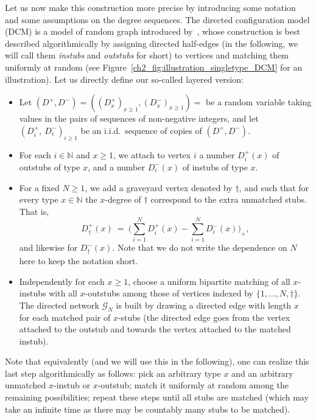 \begin{refsegment}
Let us now make this construction more precise by introducing some
notation and some assumptions on the degree sequences. The directed
configuration model (DCM) is a model of random graph introduced
by~\cite{bollobas_probabilistic_1980}, whose construction is best
described algorithmically by assigning directed half-edges (in the
following, we will call them \emph{instubs} and \emph{outstubs} for
short) to vertices and matching them uniformly at random (see
Figure~\ref{ch2_fig:illustration_singletype_DCM} for an illustration). Let
us directly define our so-called layered version:
\begin{itemize}
\item Let $(D^{+},D^-)=((D^{+}_x)_{x\geq 1},(D^-_x)_{x\geq 1})=$ be
  a random variable taking values in the pairs of sequences of
  non-negative integers, and let $(D^+_i,\ D^-_i)_{i\geq 1}$ be an
  i.i.d.\ sequence of copies of $(D^{+},D^-)$.
\item For each $i\in \mathbb{N}$ and $x\geq 1$, we attach to vertex
  $i$ a number $D^+_i(x)$ of outstubs of type $x$, and a number
  $D^-_i(x)$ of instubs of type $x$.
\item For a fixed $N\geq 1$, we add a graveyard vertex denoted by
  $\dagger$, and such that for every type $x\in\mathbb{N}$ the
  $x$-degree of $\dagger$ correspond to the extra unmatched stubs.
  That is,
  \[
    D_{\dagger}^{+}(x)\ =\ \Big(\sum_{i=1}^N D^{+}_{i}(x) -
    \sum_{i=1}^N D^{-}_{i}(x)\Big)_+,
  \]
  and likewise for $D_{\dagger}^{-}(x)$. Note that we do not write the
  dependence on $N$ here to keep the notation short.
\item Independently for each $x\geq 1$, choose a uniform bipartite
  matching of all $x$-instubs with all $x$-outstubs among those of
  vertices indexed by $\{1,\dots,N, \dagger\}$. The directed
  network $\mathcal{G}_N$ is built by drawing a directed edge with
  length $x$ for each matched pair of $x$-stubs (the directed edge
  goes from the vertex attached to the outstub and towards the vertex
  attached to the matched instub).
\end{itemize}
Note that equivalently (and we will use this in the following), one
can realize this last step algorithmically as follows: pick an
arbitrary type $x$ and an arbitrary unmatched $x$-instub or
$x$-outstub; match it uniformly at random among the remaining
possibilities; repeat these steps until all stubs are matched (which
may take an infinite time as there may be countably many stubs to be
matched).
\begin{figure}[h]

\end{figure}
\end{refsegment}
